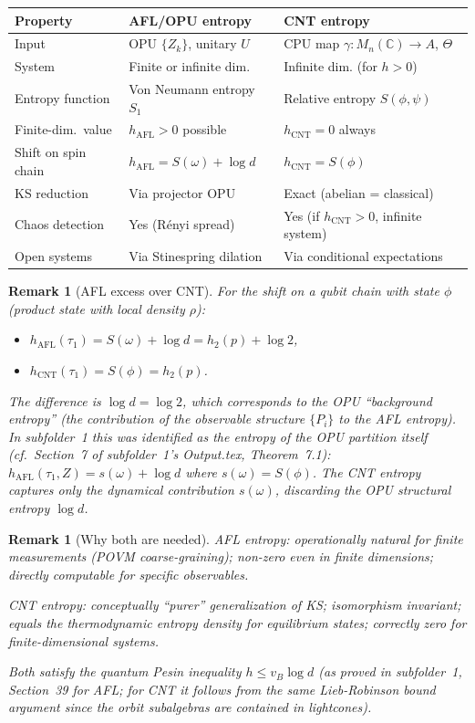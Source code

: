 \documentclass[12pt,a4paper]{article}
\newtheorem{remark}[theorem]{Remark}
\newcommand{\CC}{\mathbb{C}}
\newcommand{\Mn}{M_n(\CC)}
\newcommand{\thetaaut}{\Theta}
\begin{document}
\begin{center}
\begin{tabular}{@{}lll@{}}
\toprule
\textbf{Property} & \textbf{AFL/OPU entropy} & \textbf{CNT entropy} \\
\midrule
Input & OPU $\{Z_k\}$, unitary $U$ & CPU map $\gamma:\Mn\to A$, $\thetaaut$ \\
System & Finite or infinite dim. & Infinite dim. (for $h>0$) \\
Entropy function & Von Neumann entropy $S_1$ & Relative entropy $S(\phi,\psi)$ \\
Finite-dim.\ value & $h_\mathrm{AFL}>0$ possible & $h_\mathrm{CNT}=0$ always \\
Shift on spin chain & $h_\mathrm{AFL}=S(\omega)+\log d$ & $h_\mathrm{CNT}=S(\phi)$ \\
KS reduction & Via projector OPU & Exact (abelian = classical) \\
Chaos detection & Yes (Rényi spread) & Yes (if $h_\mathrm{CNT}>0$, infinite system) \\
Open systems & Via Stinespring dilation & Via conditional expectations \\
\bottomrule
\end{tabular}
\end{center}

\begin{remark}[AFL excess over CNT]\label{rmk:afl_excess}
For the shift on a qubit chain with state $\phi$ (product state with local density $\rho$):
\begin{itemize}
  \item $h_\mathrm{AFL}(\tau_1) = S(\omega)+\log d = h_2(p)+\log 2$,
  \item $h_\mathrm{CNT}(\tau_1) = S(\phi) = h_2(p)$.
\end{itemize}
The difference is $\log d = \log 2$, which corresponds to the OPU ``background entropy''
(the contribution of the observable structure $\{P_i\}$ to the AFL entropy).
In subfolder~1 this was identified as the entropy of the OPU partition itself
(cf.\ Section~7 of subfolder~1's Output.tex, Theorem~7.1):
$h_\mathrm{AFL}(\tau_1,Z) = s(\omega)+\log d$ where $s(\omega)=S(\phi)$.
The CNT entropy captures only the dynamical contribution $s(\omega)$, discarding the
OPU structural entropy $\log d$.
\end{remark}

\begin{remark}[Why both are needed]\label{rmk:both_needed}
AFL entropy: operationally natural for finite measurements (POVM coarse-graining);
non-zero even in finite dimensions; directly computable for specific observables.

CNT entropy: conceptually ``purer'' generalization of KS; isomorphism invariant;
equals the thermodynamic entropy density for equilibrium states; correctly zero for
finite-dimensional systems.

Both satisfy the quantum Pesin inequality $h\le v_B\log d$
(as proved in subfolder~1, Section~39 for AFL; for CNT it follows from the same
Lieb-Robinson bound argument since the orbit subalgebras are contained in lightcones).
\end{remark}
\end{document}
